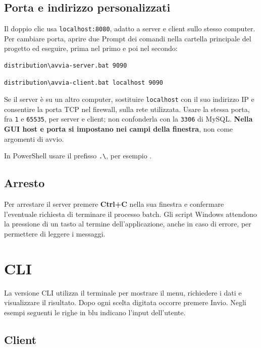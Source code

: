 \documentclass[11pt,a4paper]{article}
\begin{document}
\subsection*{Porta e indirizzo personalizzati}

Il doppio clic usa \texttt{localhost:8080}, adatto a server e client sullo
stesso computer. Per cambiare porta, aprire due Prompt dei comandi nella
cartella principale del progetto ed eseguire, prima nel primo e poi nel secondo:
\begin{lstlisting}
distribution\avvia-server.bat 9090
\end{lstlisting}
\begin{lstlisting}
distribution\avvia-client.bat localhost 9090
\end{lstlisting}

Se il server è su un altro computer, sostituire \texttt{localhost} con il suo
indirizzo IP e consentire la porta TCP nel firewall, sulla rete utilizzata.
Usare la stessa porta, fra \texttt{1} e \texttt{65535}, per server e client;
non confonderla con la \texttt{3306} di MySQL. \textbf{Nella GUI host e porta
si impostano nei campi della finestra}, non come argomenti di avvio.

In PowerShell usare il prefisso \texttt{.\textbackslash}, per esempio
.

\subsection*{Arresto}

Per arrestare il server premere \textbf{Ctrl+C} nella sua finestra e confermare
l'eventuale richiesta di terminare il processo batch. Gli script Windows
attendono la pressione di un tasto al termine dell'applicazione, anche in caso
di errore, per permettere di leggere i messaggi.

\clearpage
\section*{CLI}

La versione CLI utilizza il terminale per mostrare il menu, richiedere i dati e
visualizzare il risultato. Dopo ogni scelta digitata occorre premere Invio.
Negli esempi seguenti le righe in \textcolor{MAPinput}{blu} indicano l'input
dell'utente.

\subsection*{Client}
\end{document}
